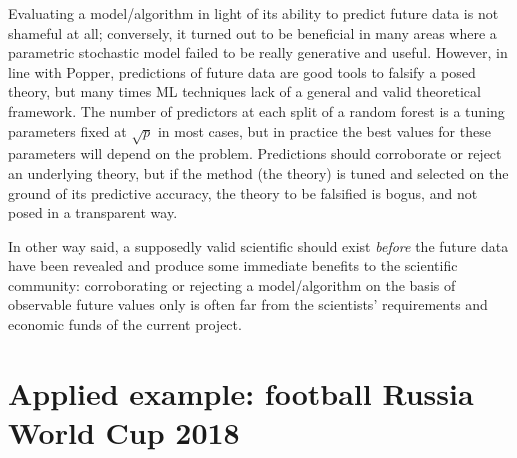 \documentclass{statsoc}
\begin{document}
Evaluating a model/algorithm in light of its ability to predict future data is not shameful at all; conversely, it turned out to be beneficial in many areas where a parametric 
stochastic model failed to be really generative and useful. However, in line with Popper, predictions of future data are good tools to falsify a posed theory, but many times ML 
techniques lack of a general and valid theoretical framework. The number of predictors at each split of a random forest is a tuning parameters fixed at $\sqrt{p}$ in most cases, but 
in practice the best values for these parameters will depend on the problem. Predictions should corroborate or reject an underlying theory, but if the method (the theory) is tuned 
and selected on the ground of its predictive accuracy, the theory to be falsified is bogus, and not posed in a transparent way.

In other way said, a supposedly valid scientific should exist \emph{before} the future data have been revealed and produce some immediate benefits to the scientific community: corroborating or rejecting a model/algorithm on the basis of observable future values only is often far from the scientists' requirements and economic funds of the current project.

\color{blue}

%
%
%
%
%

\color{black}



\section{Applied example: football Russia World Cup 2018}

\color{blue}
\end{document}
